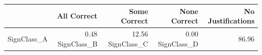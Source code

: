 \begin{tabular}{lrrrr}
\toprule
 & All Correct & Some Correct & None Correct & No Justifications \\
\midrule
SignClass_A & 0.48%
SignClass_B & 12.56%
SignClass_C & 0.00%
SignClass_D & 86.96%
\bottomrule
\end{tabular}
